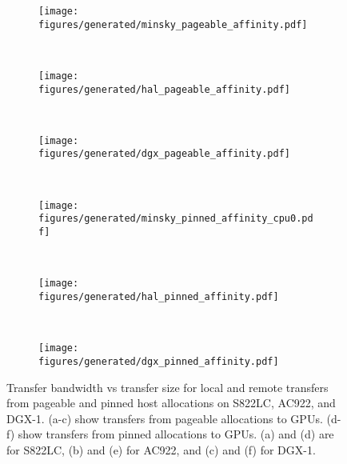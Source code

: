 \begin{figure}[ht]
	\centering
	\begin{subfigure}[b]{0.31\textwidth}
		\texttt{[image: figures/generated/minsky\_pageable\_affinity.pdf]}
		\caption{}
		\label{fig:minsky_pageable_affinity}
	\end{subfigure}
	~
	\begin{subfigure}[b]{0.31\textwidth}
		\texttt{[image: figures/generated/hal\_pageable\_affinity.pdf]}
		\caption{}
		\label{fig:hal_pageable_affinity}
	\end{subfigure}
	~
	\begin{subfigure}[b]{0.31\textwidth}
		\texttt{[image: figures/generated/dgx\_pageable\_affinity.pdf]}
		\caption{}
		\label{fig:dgx_pageable_affinity}
	\end{subfigure}
	\\
	\begin{subfigure}[b]{0.31\textwidth}
		\texttt{[image: figures/generated/minsky\_pinned\_affinity\_cpu0.pdf]}
		\caption{}
		\label{fig:minsky_pinned_affinity}
	\end{subfigure}
	~
	\begin{subfigure}[b]{0.31\textwidth}
		\texttt{[image: figures/generated/hal\_pinned\_affinity.pdf]}
		\caption{}
		\label{fig:hal_pinned_affinity}
	\end{subfigure}
	~
	\begin{subfigure}[b]{0.31\textwidth}
		\texttt{[image: figures/generated/dgx\_pinned\_affinity.pdf]}
		\caption{}
		\label{fig:dgx_pinned_affinity}
		
	\end{subfigure}
	\caption[]{
		Transfer bandwidth vs transfer size for local and remote transfers from pageable and pinned host allocations on S822LC, AC922, and DGX-1.
		(a-c) show transfers from pageable allocations to GPUs.
		(d-f) show transfers from pinned allocations to GPUs.
		(a) and (d) are for S822LC, (b) and (e) for AC922, and (c) and (f) for DGX-1.
	}
	\label{fig:cpu-gpu-affinity-direction}
\end{figure}



